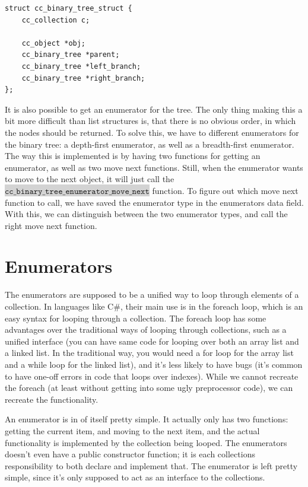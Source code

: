 \documentclass[table]{ituthesis}
\newcommand{\highlight}[1]{\colorbox{lightGray}{$\displaystyle \texttt{#1}$}}
\begin{document}
\begin{lstlisting}[label=cc_binary_tree-struct,caption=Internal representation of Binary Tree]
struct cc_binary_tree_struct {
	cc_collection c;
	
	cc_object *obj;
	cc_binary_tree *parent;
	cc_binary_tree *left_branch;
	cc_binary_tree *right_branch;
};
\end{lstlisting}

It is also possible to get an enumerator for the tree. The only thing making this a bit more difficult than list structures is, that there is no obvious order, in which the nodes should be returned. To solve this, we have to different enumerators for the binary tree: a depth-first enumerator, as well as a breadth-first enumerator. The way this is implemented is by having two functions for getting an enumerator, as well as two move next functions. Still, when the enumerator wants to move to the next object, it will just call the \highlight{cc\_binary\_tree\_enumerator\_move\_next} function. To figure out which move next function to call, we have saved the enumerator type in the enumerators data field. With this, we can distinguish between the two enumerator types, and call the right move next function.
	
\section{Enumerators}

	The enumerators are supposed to be a unified way to loop through elements of a collection. In languages like C\#, their main use is in the foreach loop, which is an easy syntax for looping through a collection. The foreach loop has some advantages over the traditional ways of looping through collections, such as a unified interface (you can have same code for looping over both an array list and a linked list. In the traditional way, you would need a for loop for the array list and a while loop for the linked list), and it's less likely to have bugs (it's common to have one-off errors in code that loops over indexes). While we cannot recreate the foreach (at least without getting into some ugly preprocessor code), we can recreate the functionality.

	An enumerator is in of itself pretty simple. It actually only has two functions: getting the current item, and moving to the next item, and the actual functionality is implemented by the collection being looped. The enumerators doesn't even have a public constructor function; it is each collections responsibility to both declare and implement that. The enumerator is left pretty simple, since it's only supposed to act as an interface to the collections.
\end{document}
